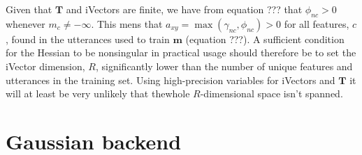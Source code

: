 Given that $\mathbf{T}$ and iVectors are finite, we have from equation ??? that $\phi_{nc} > 0$ whenever $m_c \neq -\infty$. This mens that $a_{xy}=\max(\gamma_{nc}, \phi_{nc})>0$ for all features, $c$, found in the utterances used to train $\mathbf{m}$ (equation ???). A sufficient condition for the Hessian to be nonsingular in practical usage should therefore be to set the iVector dimension, $R$, significantly lower than the number of unique features and utterances in the training set. Using high-precision variables for iVectors and $\mathbf{T}$ it will at least be very unlikely that thewhole $R$-dimensional space isn't spanned.




\section{Gaussian backend}


